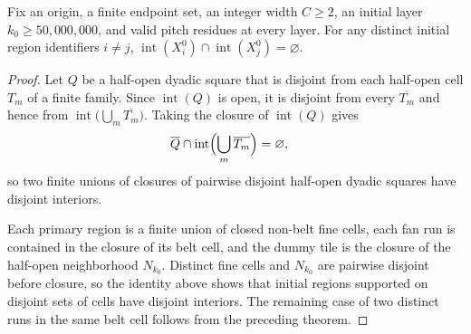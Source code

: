 \begin{lemma}
    \label{thm:area_law_initial_open_disjoint}
    \leanok
    Fix an origin, a finite endpoint set, an integer width $C\ge 2$,
    an initial layer $k_0\ge 50{,}000{,}000$, and valid pitch residues
    at every layer. For any distinct initial region identifiers $i\ne j$,
    $\operatorname{int}(X_i^0)\cap\operatorname{int}(X_j^0)=\varnothing$.
\end{lemma}
\begin{proof}\leanok
    Let $Q$ be a half-open dyadic square that is disjoint from each half-open
    cell $T_m$ of a finite family. Since $\operatorname{int}(Q)$ is open, it
    is disjoint from every $\overline{T_m}$ and hence from
    $\operatorname{int}\bigl(\bigcup_m\overline{T_m}\bigr)$. Taking the
    closure of $\operatorname{int}(Q)$ gives
    \begin{align}
        \overline Q\cap\operatorname{int}\Bigl(\bigcup_m\overline{T_m}\Bigr)
         & =\varnothing,
    \end{align}
    so two finite unions of closures of pairwise disjoint half-open dyadic
    squares have disjoint interiors.

    Each primary region is a finite union of closed non-belt fine cells, each
    fan run is contained in the closure of its belt cell, and the dummy tile
    is the closure of the half-open neighborhood $N_{k_0}$. Distinct fine
    cells and $N_{k_0}$ are pairwise disjoint before closure, so the
    identity above shows that initial regions supported on disjoint sets of
    cells have disjoint interiors. The remaining case of two distinct runs in
    the same belt cell follows from the preceding theorem.
\end{proof}

